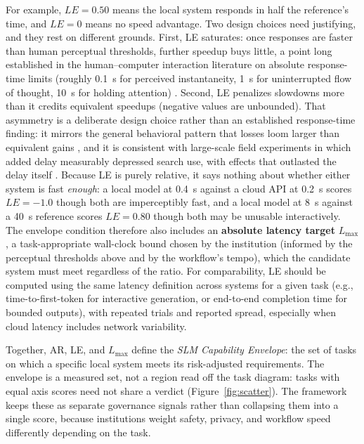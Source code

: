 \documentclass[11pt]{article}
\begin{document}
For example, $LE = 0.50$ means the local system responds in half the reference's time, and $LE = 0$ means no speed advantage. Two design choices need justifying, and they rest on different grounds. First, LE saturates: once responses are faster than human perceptual thresholds, further speedup buys little, a point long established in the human--computer interaction literature on absolute response-time limits (roughly 0.1~s for perceived instantaneity, 1~s for uninterrupted flow of thought, 10~s for holding attention) \cite{Miller1968, Nielsen1993}. Second, LE penalizes slowdowns more than it credits equivalent speedups (negative values are unbounded). That asymmetry is a deliberate design choice rather than an established response-time finding: it mirrors the general behavioral pattern that losses loom larger than equivalent gains \cite{Kahneman1979, Tversky1991}, and it is consistent with large-scale field experiments in which added delay measurably depressed search use, with effects that outlasted the delay itself \cite{Brutlag2009}. Because LE is purely relative, it says nothing about whether either system is fast \emph{enough}: a local model at 0.4~s against a cloud API at 0.2~s scores $LE = -1.0$ though both are imperceptibly fast, and a local model at 8~s against a 40~s reference scores $LE = 0.80$ though both may be unusable interactively. The envelope condition therefore also includes an \textbf{absolute latency target} $L_{\max}$, a task-appropriate wall-clock bound chosen by the institution (informed by the perceptual thresholds above and by the workflow's tempo), which the candidate system must meet regardless of the ratio. For comparability, LE should be computed using the same latency definition across systems for a given task (e.g., time-to-first-token for interactive generation, or end-to-end completion time for bounded outputs), with repeated trials and reported spread, especially when cloud latency includes network variability.

Together, AR, LE, and $L_{\max}$ define the \emph{SLM Capability Envelope}: the set of tasks on which a specific local system meets its risk-adjusted requirements. The envelope is a measured set, not a region read off the task diagram: tasks with equal axis scores need not share a verdict (Figure~\ref{fig:scatter}). The framework keeps these as separate governance signals rather than collapsing them into a single score, because institutions weight safety, privacy, and workflow speed differently depending on the task.

\end{document}
